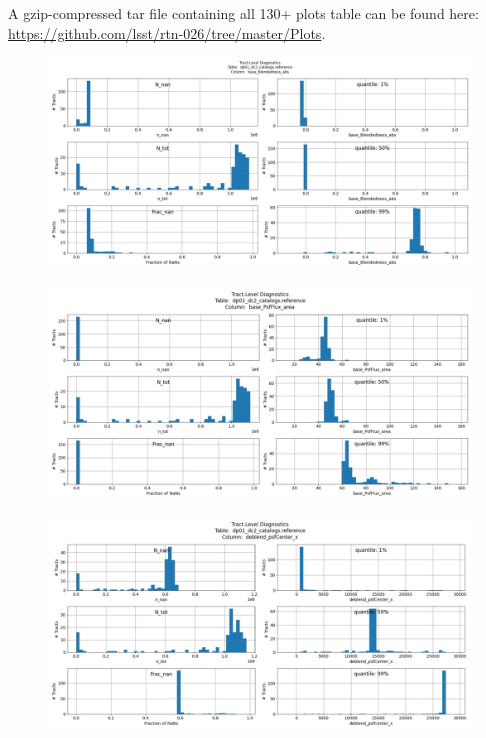 \documentclass[DM,authoryear,toc]{lsstdoc}
\begin{document}
A gzip-compressed tar file containing all 130$+$ plots table can be
found here: \url{https://github.com/lsst/rtn-026/tree/master/Plots}.


\begin{figure}[h]
\centering
\includegraphics[width=1.0\linewidth]{Plots/TAP_verify_DP01.dp01_dc2_catalogs.reference.base_Blendedness_abs.pdf}
\caption{}
\label{fig:reference_base_blendednes_abs}
\end{figure}

\begin{figure}[h]
\centering
\includegraphics[width=1.0\linewidth]{Plots/TAP_verify_DP01.dp01_dc2_catalogs.reference.base_PsfFlux_area.pdf}
\caption{}
\label{fig:reference_base_psfflux_area}
\end{figure}

\begin{figure}[h]
\centering
\includegraphics[width=1.0\linewidth]{Plots/TAP_verify_DP01.dp01_dc2_catalogs.reference.deblend_psfCenter_x.pdf}
\caption{}
\label{fig:reference_deblend_psfcenter_x}
\end{figure}
\end{document}

